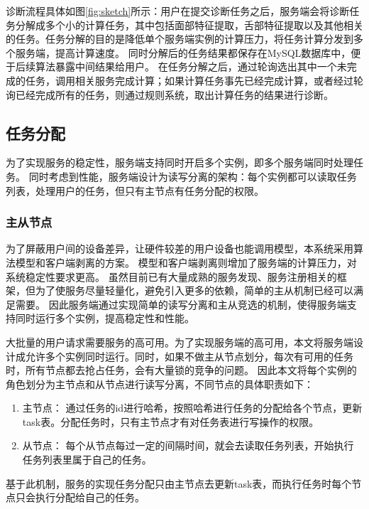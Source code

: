 诊断流程具体如图\ref{fig:sketch}所示：用户在提交诊断任务之后，服务端会将诊断任务分解成多个小的计算任务，其中包括面部特征提取，舌部特征提取以及其他相关的任务。任务分解的目的是降低单个服务端实例的计算压力，将任务计算分发到多个服务端，提高计算速度。
同时分解后的任务结果都保存在MySQL数据库中，便于后续算法暴露中间结果给用户。
在任务分解之后，通过轮询选出其中一个未完成的任务，调用相关服务完成计算；如果计算任务事先已经完成计算，或者经过轮询已经完成所有的任务，则通过规则系统，取出计算任务的结果进行诊断。



\subsection{任务分配}
为了实现服务的稳定性，服务端支持同时开启多个实例，即多个服务端同时处理任务。
同时考虑到性能，服务端设计为读写分离的架构：每个实例都可以读取任务列表，处理用户的任务，但只有主节点有任务分配的权限。


\subsubsection{主从节点}
为了屏蔽用户间的设备差异，让硬件较差的用户设备也能调用模型，本系统采用算法模型和客户端剥离的方案。
模型和客户端剥离则增加了服务端的计算压力，对系统稳定性要求更高。
虽然目前已有大量成熟的服务发现、服务注册相关的框架，但为了使服务尽量轻量化，避免引入更多的依赖，简单的主从机制已经可以满足需要。
因此服务端通过实现简单的读写分离和主从竞选的机制，使得服务端支持同时运行多个实例，提高稳定性和性能。


大批量的用户请求需要服务的高可用。为了实现服务端的高可用，本文将服务端设计成允许多个实例同时运行。同时，如果不做主从节点划分，每次有可用的任务时，所有节点都去抢占任务，会有大量锁的竞争的问题。
因此本文将每个实例的角色划分为主节点和从节点进行读写分离，不同节点的具体职责如下：
\begin{enumerate}
    \item 主节点： 通过任务的id进行哈希，按照哈希进行任务的分配给各个节点，更新task表。分配任务时，只有主节点才有对任务表进行写操作的权限。

    \item 从节点： 每个从节点每过一定的间隔时间，就会去读取任务列表，开始执行任务列表里属于自己的任务。  

\end{enumerate}

基于此机制，服务的实现任务分配只由主节点去更新task表，而执行任务时每个节点只会执行分配给自己的任务。

